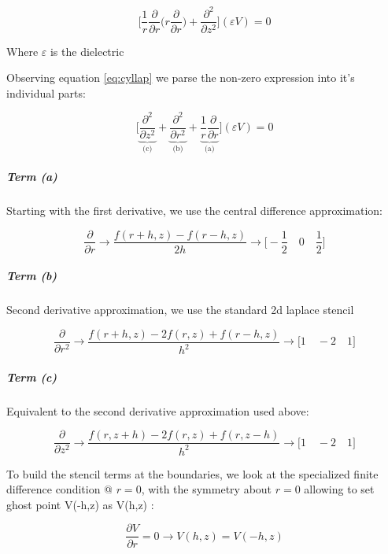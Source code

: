 \begin{equation} 
\bigg[\frac{1}{r}\frac{\partial}{\partial r} \bigg( r \frac{\partial}{\partial r}\bigg) + \frac{\partial^2}{\partial z^2} \bigg](\varepsilon V) = 0
\end{equation}

Where $\varepsilon$ is the dielectric

Observing equation \autoref{eq:cyllap} we parse the non-zero expression into it's individual parts:

\begin{equation} \label{eq:cyllap_xpand}
    \bigg[\underbrace{\frac{\partial^2}{\partial z^2}}_\text{(c)} + \underbrace{\frac{\partial^2}{\partial r^2}}_\text{(b)}  + \underbrace{\frac{1}{r} \frac{\partial}{\partial r}}_\text{(a)}\bigg] (\varepsilon V) = 0
\end{equation}

\subparagraph*{Term (a)}

Starting with the first derivative, we use the central difference approximation:

\begin{equation}
    \frac{\partial}{\partial r} \rightarrow \frac{f(r + h, z) - f(r - h, z )}{2h} \rightarrow \bigg[-\frac{1}{2} \quad  0  \quad \frac{1}{2} \bigg]
\end{equation}

\subparagraph*{Term (b)}

Second derivative approximation, we use the standard 2d laplace stencil

\begin{equation}
    \frac{\partial}{\partial r^2} \rightarrow \frac{f(r+h, z) - 2 f(r, z) + f(r-h, z)}{h^2} \rightarrow \big[ 1 \quad -2 \quad 1 \big]
\end{equation}

\subparagraph*{Term (c)}
Equivalent to the second derivative approximation used above:

\begin{equation}
    \frac{\partial}{\partial z^2} \rightarrow  \frac{f(r, z+h) - 2 f(r, z) + f(r, z-h)}{h^2} \rightarrow \big[ 1\quad -2 \quad 1 \big]
\end{equation}

To build the stencil terms at the boundaries, we look at the specialized finite difference condition @ $ r = 0 $, with the symmetry about $r=0$ allowing to set ghost point V(-h,z) as V(h,z) :

\begin{equation}\label{eq:first_deriv_V}
	\frac{\partial V}{\partial r} = 0 \rightarrow V(h, z) = V(-h,z)
\end{equation}

